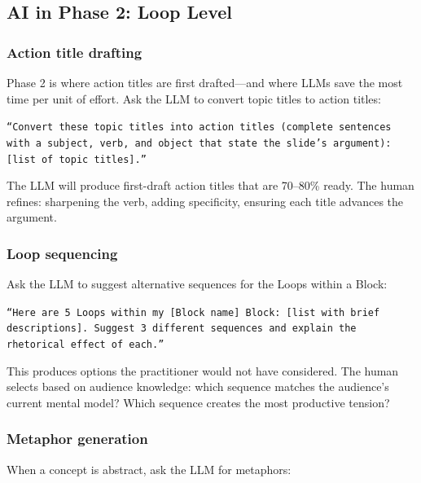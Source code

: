 \subsection{AI in Phase 2: Loop Level}

\subsubsection{Action title drafting}

Phase 2 is where action titles are first drafted---and where LLMs save the most time per unit of effort. Ask the LLM to convert topic titles to action titles:

\texttt{``Convert these topic titles into action titles (complete sentences with a subject, verb, and object that state the slide's argument): [list of topic titles].''}

The LLM will produce first-draft action titles that are 70--80\% ready. The human refines: sharpening the verb, adding specificity, ensuring each title advances the argument.

\subsubsection{Loop sequencing}

Ask the LLM to suggest alternative sequences for the Loops within a Block:

\texttt{``Here are 5 Loops within my [Block name] Block: [list with brief descriptions]. Suggest 3 different sequences and explain the rhetorical effect of each.''}

This produces options the practitioner would not have considered. The human selects based on audience knowledge: which sequence matches the audience's current mental model? Which sequence creates the most productive tension?

\subsubsection{Metaphor generation}

When a concept is abstract, ask the LLM for metaphors:

